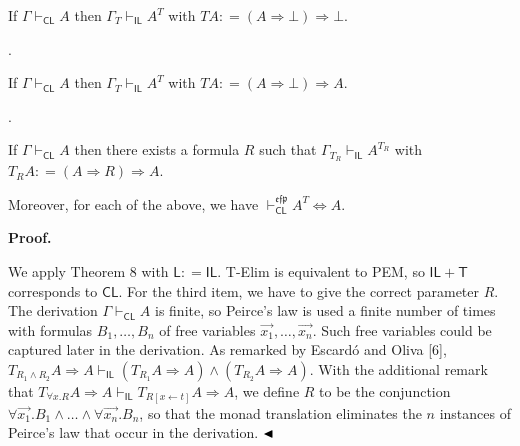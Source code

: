 If $\Gamma\vdash_{\mathsf{CL}}A$ then $\Gamma_{T}\vdash_{\mathsf{IL}}A^{T}$ with $TA\mathrel{\mathop{:}}=(A\mathbin{\Rightarrow}\bot)\mathbin{\Rightarrow}\bot$.\par
 
 
 
\par{}. 
 
If $\Gamma\vdash_{\mathsf{CL}}A$ then $\Gamma_{T}\vdash_{\mathsf{IL}}A^{T}$ with $TA\mathrel{\mathop{:}}=(A\mathbin{\Rightarrow}\bot)\mathbin{\Rightarrow}A$.\par
 
 
 
\par{}. 
 
If $\Gamma\vdash_{\mathsf{CL}}A$ then there exists a formula $R$ such that $\Gamma_{T_{R}}\vdash_{\mathsf{IL}}A^{T_{R}}$ with $T_{R}A\mathrel{\mathop{:}}=(A\mathbin{\Rightarrow}R)\mathbin{\Rightarrow}A$.\par
 
 
  
Moreover, for each of the above, we have $\vdash_{\mathsf{CL}}^{\mathfrak{e}\mathfrak{f}\mathfrak{p}}A^{T}\Leftrightarrow
A$.\par
 
 
 
 
\par\medskip\noindent\textbf{Proof.}\par
 
 
We apply Theorem 8 with $\mathsf{L}\mathrel{\mathop{:}}=\mathsf{IL}$. T-Elim is equivalent to PEM, so $\mathsf{IL}+\mathsf{T}$ corresponds to $\mathsf{CL}$. For the third item, we have to give the correct parameter $R$. The derivation $\Gamma\vdash_{\mathsf{CL}}A$ is finite, so Peirce’s law is used a finite number of times with formulas $B_{1},\ldots,B_{n}$ of free variables $\vec{x_{1}},\ldots,\vec{x_{n}}$. Such free variables could be captured later in the derivation. As remarked by Escardó and Oliva [6], $T_{R_{1}\mathbin{\wedge}R_{2}}A\mathbin{\Rightarrow}A\vdash_{\mathsf{IL}}(T_{R_{1}}A\mathbin{\Rightarrow}A)\mathbin{\wedge}(T_{R_{2}}A\mathbin{\Rightarrow}A)$. With the additional remark that $T_{{\forall}x.R}A\mathbin{\Rightarrow}A\vdash_{\mathsf{IL}}T_{R[x\leftarrow t]}A\mathbin{\Rightarrow}A$, we define $R$ to be the conjunction ${\forall}\vec{x_{1}}.B_{1}\mathbin{\wedge}\ldots\mathbin{\wedge}{\forall}\vec{x_{n}}.B_{n}$, so that the monad translation eliminates the $n$ instances of Peirce’s law that occur in the derivation. $\hfill\blacktriangleleft$\par
 
